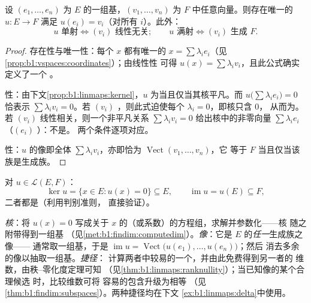 \begin{proposition}[线性映射由基上的值确定]\label{prop:b1:linmaps:basis}
设 $(e_1, \dots, e_n)$ 为 $E$ 的一组基，$(v_1, \dots, v_n)$
为 $F$ 中任意向量。则存在唯一的 $u \colon
E \to F$ 满足 $u(e_i) = v_i$（对所有 $i$）。此外：
\[
u \text{ 单射} \iff (v_i) \text{ 线性无关};
\qquad
u \text{ 满射} \iff (v_i) \text{ 生成 } F .
\]
\end{proposition}

\begin{proof}
存在性与唯一性：每个 $x$ 都有唯一的 $x = \sum
\lambda_i e_i$（见\cref{prop:b1:vspaces:coordinates}）；由线性性
可得 $u(x) = \sum \lambda_i v_i$，且此公式确实定义了一个
。

性：由下文\cref{prop:b1:linmaps:kernel}，$u$
为当且仅当其核平凡。而 $u\bigl(\sum\lambda_i
e_i\bigr) = 0$ 恰表示 $\sum\lambda_i v_i = 0$。若 $(v_i)$
，则此式迫使每个 $\lambda_i = 0$，即核只含 $0$，
从而为。若 $(v_i)$ 线性相关，则一个非平凡关系
$\sum\lambda_i v_i = 0$ 给出核中的非零向量 $\sum\lambda_i e_i$
（$(e_i)$ ）：不是。
两个条件逐项对应。

性：$u$ 的像即全体 $\sum\lambda_i
v_i$，亦即恰为 $\operatorname{Vect}(v_1, \dots, v_n)$，它
等于 $F$ 当且仅当该族是生成族。
\end{proof}

\begin{definition}[核与像]\label{def:b1:linmaps:kerim}
对 $u \in \mathcal{L}(E, F)$：
\[
\ker u = \{x \in E : u(x) = 0\} \subseteq E,
\qquad
\operatorname{im} u = u(E) \subseteq F ,
\]
二者都是（利用判别准则，
直接验证）。
\end{definition}

\begin{method}[核与像的实际求法]
\label{met:b1:linmaps:kerim}
\emph{核}：将 $u(x) = 0$ 写成关于
$x$ 的（或系数）的方程组，求解并参数化——核
随之附带得到一组基
（见\cref{met:b1:findim:computedim}）。\emph{像}：它是
$E$ 的\emph{任一}生成族之像——
通常取一组基，于是 $\operatorname{im} u =
\operatorname{Vect}\bigl(u(e_1), \dots, u(e_n)\bigr)$；然后
消去多余的像以抽取一组基。\emph{捷径}：
计算两者中较易的一个，并由此免费得到另一者的
维数，由秩--零化度定理可知
（见\cref{thm:b1:linmaps:ranknullity}）；当已知像的某个合理候选
时，比较维数可将
容易的包含升级为相等
（见\cref{thm:b1:findim:subspaces}）。两种捷径均在下文
\cref{ex:b1:linmaps:delta}中使用。
\end{method}

